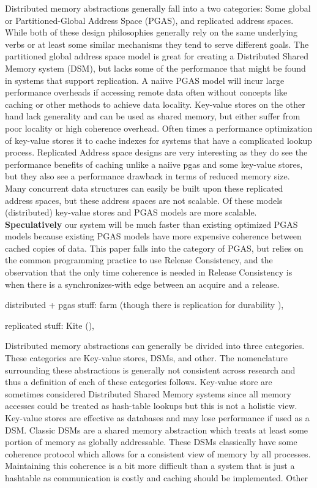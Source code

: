 \documentclass[sigplan,nonacm]{acmart}
\begin{document}
Distributed memory abstractions generally fall into a two categories:
Some global or Partitioned-Global Address Space (PGAS), and replicated address spaces. While both of these design philosophies 
generally rely on the same underlying verbs or at least some similar mechanisms they tend to 
serve different goals. The partitioned global address space model is great for creating a Distributed 
Shared Memory system (DSM), but lacks some of the performance that might be found in systems that support replication. 
A naiive PGAS model will incur large performance overheads if accessing remote data often
without concepts like caching or other methods to achieve data locality. Key-value stores on the other hand lack generality and can be used as shared memory, but 
either suffer from poor locality or high coherence overhead. Often times a performance optimization of key-value stores it to cache indexes for 
systems that have a complicated lookup process. Replicated Address space designs are very interesting as they do see the performance 
benefits of caching unlike a naiive pgas and some key-value stores, but they also see a performance drawback in terms of 
reduced memory size. Many concurrent data structures can easily be built upon these replicated address spaces, but these address 
spaces are not scalable. Of these models (distributed) key-value stores and PGAS models are more scalable. \textbf{Speculatively} our 
system will be much faster than existing optimized PGAS models because existing PGAS models have more expensive coherence 
between cached copies of data. This paper falls into the category of PGAS, but relies on the common programming practice 
to use Release Consistency, and the observation that the only time coherence is needed in Release Consistency 
is when there is a synchronizes-with edge between an acquire and a release.

distributed + pgas stuff:
farm (though there is replication for durability \cite{Dragojevic-NSDI-2014}), 

replicated stuff:
Kite (\cite{Gavrielatos-PPoPP-2020}), 

Distributed memory abstractions can generally be divided into three categories.
These categories are Key-value stores, DSMs, and other. The nomenclature surrounding 
these abstractions is generally not consistent across research and thus a definition of each 
of these categories follows. Key-value store are sometimes considered Distributed Shared Memory systems
since all memory accesses could be treated as hash-table lookups but this is not a holistic view. Key-value
stores are effective as databases and may lose performance if used as a DSM. Classic DSMs are a shared
memory abstraction which treats at least some portion of memory as globally addressable. These DSMs 
classically have some coherence protocol which allows for a consistent view of memory by all processes.
Maintaining this coherence is a bit more difficult than a system that is just a hashtable as communication is 
costly and caching should be implemented. Other 
\end{document}

